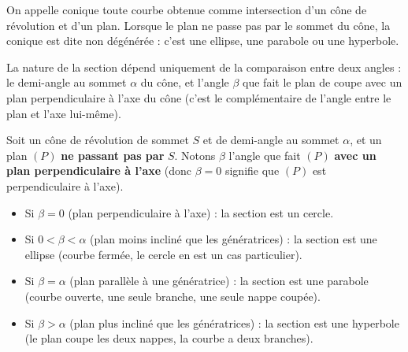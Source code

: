\documentclass[11pt]{article}
\newcommand{\cle}[1]{{\popxbold\color{popdark}#1}}
\begin{document}
\begin{definition}[Conique]
On appelle \cle{conique} toute courbe obtenue comme intersection d'un cône de révolution et d'un plan. Lorsque le plan ne passe pas par le sommet du cône, la conique est dite \cle{non dégénérée} : c'est une ellipse, une parabole ou une hyperbole.
\end{definition}

La nature de la section dépend uniquement de la comparaison entre deux angles : le demi-angle au sommet $\alpha$ du cône, et l'angle $\beta$ que fait le plan de coupe avec un plan perpendiculaire à l'axe du cône (c'est le complémentaire de l'angle entre le plan et l'axe lui-même).

\begin{propriete}
Soit un cône de révolution de sommet $S$ et de demi-angle au sommet $\alpha$, et un plan $(P)$ \textbf{ne passant pas par} $S$. Notons $\beta$ l'angle que fait $(P)$ \textbf{avec un plan perpendiculaire à l'axe} (donc $\beta = 0$ signifie que $(P)$ est perpendiculaire à l'axe).
\begin{itemize}
\item Si $\beta = 0$ (plan perpendiculaire à l'axe) : la section est un \cle{cercle}.
\item Si $0 < \beta < \alpha$ (plan moins incliné que les génératrices) : la section est une \cle{ellipse} (courbe fermée, le cercle en est un cas particulier).
\item Si $\beta = \alpha$ (plan parallèle à une génératrice) : la section est une \cle{parabole} (courbe ouverte, une seule branche, une seule nappe coupée).
\item Si $\beta > \alpha$ (plan plus incliné que les génératrices) : la section est une \cle{hyperbole} (le plan coupe les deux nappes, la courbe a deux branches).
\end{itemize}
\end{propriete}
\end{document}
